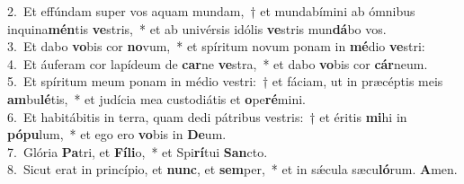 {2.~}Et effúndam super vos aquam mundam,~† et mundabímini ab ómnibus inquina\textbf{mén}tis \textbf{ve}stris,~* et ab univérsis idólis \textbf{ve}stris mun\textbf{dá}bo vos.\\
{3.~}Et dabo \textbf{vo}bis cor \textbf{no}vum,~* et spíritum novum ponam in \textbf{mé}dio \textbf{ve}stri:\\
{4.~}Et áuferam cor lapídeum de \textbf{car}ne \textbf{ve}stra,~* et dabo \textbf{vo}bis cor \textbf{cár}neum.\\
{5.~}Et spíritum meum ponam in médio vestri:~† et fáciam, ut in præcéptis meis \textbf{am}bu\textbf{lé}tis,~* et judícia mea custodiátis et \textbf{o}pe\textbf{ré}mini.\\
{6.~}Et habitábitis in terra, quam dedi pátribus vestris:~† et éritis \textbf{mi}hi in \textbf{pó}\textbf{pu}lum,~* et ego ero \textbf{vo}bis in \textbf{De}um.\\
{7.~}Glória \textbf{Pa}tri, et \textbf{Fí}\textbf{li}o,~* et Spi\textbf{rí}tui \textbf{San}cto.\\
{8.~}Sicut erat in princípio, et \textbf{nunc}, et \textbf{sem}per,~* et in sǽcula sæcu\textbf{ló}rum. \textbf{A}men.\\
